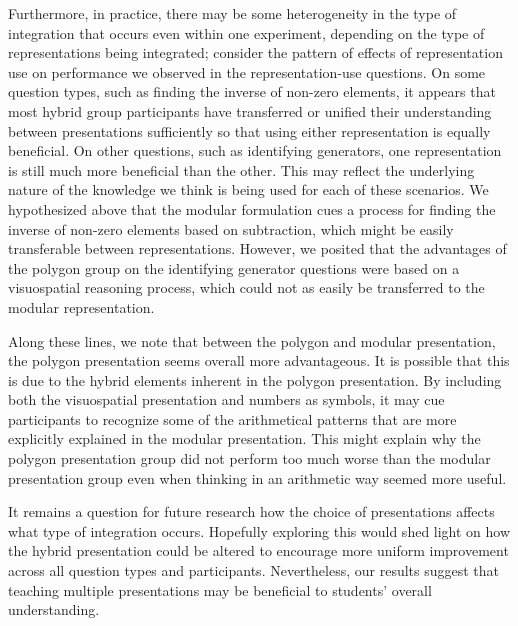 \documentclass[man,mask,10pt]{apa6}
\begin{document}
Furthermore, in practice, there may be some heterogeneity in the type of integration that occurs even within one experiment, depending on the type of representations being integrated; consider the pattern of effects of representation use on performance we observed in the representation-use questions. On some question types, such as finding the inverse of non-zero elements, it appears that most hybrid group participants have transferred or unified their understanding between presentations sufficiently so that using either representation is equally beneficial. On other questions, such as identifying generators, one representation is still much more beneficial than the other. This may reflect the underlying nature of the knowledge we think is being used for each of these scenarios. We hypothesized above that the modular formulation cues a process for finding the inverse of non-zero elements based on subtraction, which might be easily transferable between representations. However, we posited that the advantages of the polygon group on the identifying generator questions were based on a visuospatial reasoning process, which could not as easily be transferred to the modular representation. \par
Along these lines, we note that between the polygon and modular presentation, the polygon presentation seems overall more advantageous. It is possible that this is due to the hybrid elements inherent in the polygon presentation. By including both the visuospatial presentation and numbers as symbols, it may cue participants to recognize some of the arithmetical patterns that are more explicitly explained in the modular presentation. This might explain why the polygon presentation group did not perform too much worse than the modular presentation group even when thinking in an arithmetic way seemed more useful. \par
It remains a question for future research how the choice of presentations affects what type of integration occurs. Hopefully exploring this would shed light on how the hybrid presentation could be altered to encourage more uniform improvement across all question types and participants. Nevertheless, our results suggest that teaching multiple presentations may be beneficial to students' overall understanding. 
\end{document}
